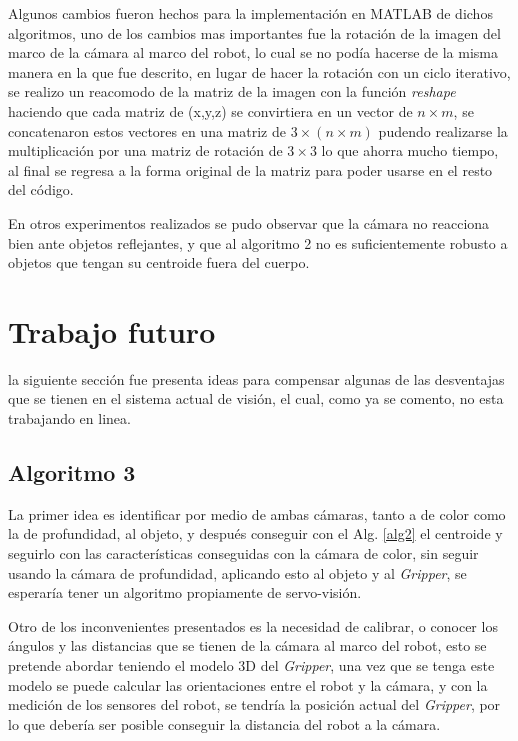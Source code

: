         
    Algunos cambios fueron hechos para la implementación en MATLAB de dichos algoritmos, uno de los cambios mas importantes fue la rotación de la imagen del marco de la cámara al marco del robot, lo cual se no podía hacerse de la misma manera en la que fue descrito, en lugar de hacer la rotación con un ciclo iterativo, se realizo un reacomodo de la matriz de la imagen con la función \textit{reshape} haciendo que cada matriz de (x,y,z) se convirtiera en un vector de $n\times m$, se concatenaron estos vectores en una matriz de $3\times(n\times m)$ pudendo realizarse la multiplicación por una matriz de rotación de $3\times 3$ lo que ahorra mucho tiempo, al final se regresa a la forma original de la matriz para poder usarse en el resto del código.
    
    En otros experimentos realizados se pudo observar que la cámara no reacciona bien ante objetos reflejantes, y que al algoritmo 2 no es suficientemente robusto a objetos que tengan su centroide  fuera del cuerpo.
    
    
    \section{Trabajo futuro}
    
    la siguiente sección fue presenta ideas para compensar algunas de las desventajas que se tienen en el sistema actual de visión, el cual, como ya se comento, no esta trabajando en linea.
    
    \subsection{Algoritmo  3}
    
    La primer idea es identificar por medio de ambas cámaras, tanto a de color como la de profundidad, al objeto, y después conseguir con el Alg. \ref{alg2} el centroide y seguirlo con las características conseguidas con la cámara de color, sin seguir usando la cámara de profundidad, aplicando esto al objeto y al \textit{Gripper}, se esperaría tener un algoritmo propiamente de servo-visión.
    
    Otro de los inconvenientes presentados es la necesidad de calibrar, o conocer los ángulos y las distancias que se tienen de la cámara al marco del robot, esto se pretende abordar teniendo el modelo 3D del \textit{Gripper}, una vez que se tenga este modelo se puede calcular las orientaciones entre el robot y la cámara, y con la medición de los sensores del robot, se tendría la posición actual del \textit{Gripper}, por lo que debería ser posible conseguir la distancia del robot a la cámara.
    
